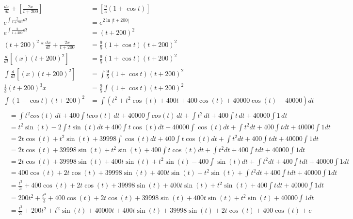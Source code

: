 \begin{prob}
\begin{enumerate}
\begin{align*}
    \frac{dx}{dt} + \left[ \frac{2x}{t+200}\right] &= \left[ \frac{9}{5}(1+\cos t) \right]\\
    e^{\int \frac{2}{t+200}dt}&=e^{2\ln |t+200|}\\
    e^{\int \frac{2}{t+200}dt}&=(t+200)^2\\
    (t+200)^2*\frac{dx}{dt} + \frac{2x}{t+200} &=  \frac{9}{5}(1+\cos t) (t+200)^2\\
    \frac{d}{dt} \left[ (x)(t+200)^2 \right] &=  \frac{9}{5}(1+\cos t) (t+200)^2\\
    \int \frac{d}{dt} \left[ (x)(t+200)^2 \right] &= \int \frac{9}{5}(1+\cos t) (t+200)^2\\
    \frac{1}{3}(t+200)^3x&=\frac{9}{5}\int(1+\cos t) (t+200)^2\\
    \int(1+\cos t) (t+200)^2&=\int(t^2 + t^2 \cos(t) + 400 t + 400 \cos (t) + 40000 \cos (t) + 40000) dt\\
    \end{align*}
    \begin{align*}
     &= \int t^2 cos(t) \,dt + 400 \int t cos(t) \,dt + 40000 \int cos(t) \,dt + \int t^2 \,dt + 400 \int t \,dt + 40000 \int 1 \,dt\\
     &=t^2 \sin (t) - 2 \int t \sin(t) dt + 400 \int t \cos(t) dt + 40000 \int \cos(t) dt + \int t^2 dt + 400 \int t dt + 40000 \int 1 dt\\
      &= 2 t \cos(t) + t^2 \sin(t) + 39998 \int \cos(t) dt + 400 \int t \cos(t) dt + \int t^2 dt + 400 \int t dt + 40000 \int 1 dt\\
       &=2 t \cos(t) + 39998 \sin(t) + t^2 \sin(t) + 400 \int t \cos(t) dt + \int t^2 dt + 400 \int t dt + 40000 \int 1 dt\\
       &=2 t \cos(t) + 39998 \sin(t) + 400 t \sin(t) + t^2 \sin(t) - 400 \int \sin(t) dt + \int t^2 dt + 400 \int t dt + 40000 \int 1 dt\\
       &= 400 \cos(t) + 2 t \cos(t) + 39998 \sin(t) + 400 t \sin(t) + t^2 \sin(t) + \int t^2 dt + 400 \int t dt + 40000 \int 1 dt\\
        &= \frac{t^3}{3} + 400 \cos(t) + 2 t \cos(t) + 39998 \sin(t) + 400 t \sin(t) + t^2 \sin(t) + 400 \int t dt + 40000 \int 1 dt\\
        &= 200 t^2 + \frac{t^3}{3} + 400 \cos(t) + 2 t \cos(t) + 39998 \sin(t) + 400 t \sin(t) + t^2 \sin(t) + 40000 \int 1 dt\\
         &= \frac{t^3}{3} + 200 t^2 + t^2 \sin(t) + 40000 t + 400 t \sin(t) + 39998 \sin(t) + 2 t \cos(t) + 400 \cos(t) + c
    \end{align*}

\end{enumerate}
\end{prob}
